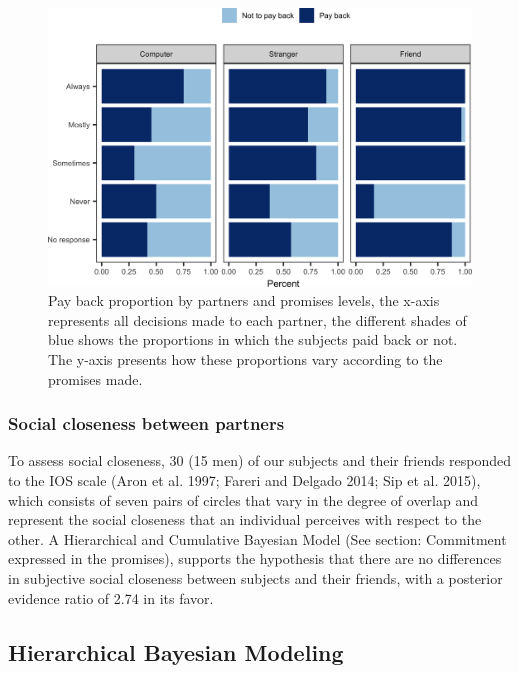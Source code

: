 \documentclass[smallextended]{svjour3}       %
\begin{document}
\begin{figure}

{\centering \includegraphics[width=0.8\linewidth]{behavioral-promises_files/figure-latex/fig2-1} 

}

\caption{Pay back proportion by partners and promises levels, the x-axis represents all decisions made to each partner, the different shades of blue shows the proportions in which the subjects paid back or not. The y-axis presents how these proportions vary according to the promises made.}\label{fig:fig2}
\end{figure}

\hypertarget{social-closeness-between-partners}{%
\subsubsection{Social closeness between
partners}\label{social-closeness-between-partners}}

To assess social closeness, 30 (15 men) of our subjects and their
friends responded to the IOS scale (Aron et al. 1997; Fareri and Delgado
2014; Sip et al. 2015), which consists of seven pairs of circles that
vary in the degree of overlap and represent the social closeness that an
individual perceives with respect to the other. A Hierarchical and
Cumulative Bayesian Model (See section: Commitment expressed in the
promises), supports the hypothesis that there are no differences in
subjective social closeness between subjects and their friends, with a
posterior evidence ratio of 2.74 in its favor.

\hypertarget{hierarchical-bayesian-modeling}{%
\subsection{Hierarchical Bayesian
Modeling}\label{hierarchical-bayesian-modeling}}
\end{document}
